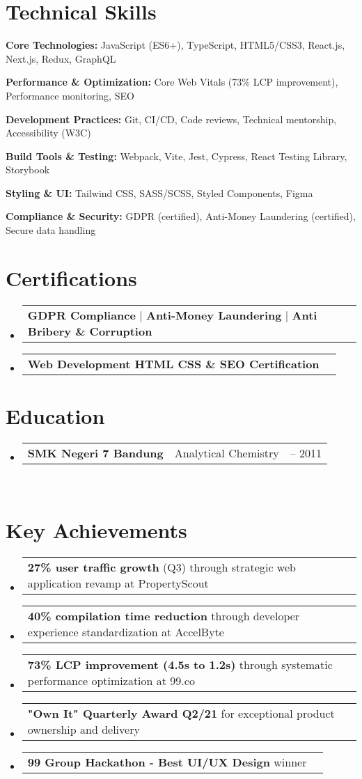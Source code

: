 \documentclass[a4paper, 11pt]{article}
\makeatletter
\newcommand{\resumeSubheading}[4]{
  \vspace{-2pt}\item
    \begin{tabularx}{0.987\textwidth}[t]{
  >{\raggedright\arraybackslash}X
  >{\centering\arraybackslash}X
  >{\raggedleft\arraybackslash}X }
      \textbf{#1} & #2 & #3 \\
    \end{tabularx}
    \textit{\small#4}\\
    \vspace{-7pt}
}
\newcommand{\resumeProjectHeading}[2]{
    \item
    \begin{tabular*}{0.987\textwidth}{l@{\extracolsep{\fill}}r}
      \small#1\\
    \end{tabular*}\vspace{-7pt}
}
\newcommand{\resumeSubHeadingListStart}{\begin{itemize}[leftmargin=0.1in, label={}]}
\newcommand{\resumeSubHeadingListEnd}{\end{itemize}\vspace{5pt}}
\makeatother
\begin{document}
\section{Technical Skills}
    \resumeSubHeadingListStart
        \small{
            \item \textbf{Core Technologies:} JavaScript (ES6+), TypeScript, HTML5/CSS3, React.js, Next.js, Redux, GraphQL
            \item \textbf{Performance \& Optimization:} Core Web Vitals (73\% LCP improvement), Performance monitoring, SEO
            \item \textbf{Development Practices:} Git, CI/CD, Code reviews, Technical mentorship, Accessibility (W3C)
            \item \textbf{Build Tools \& Testing:} Webpack, Vite, Jest, Cypress, React Testing Library, Storybook
            \item \textbf{Styling \& UI:} Tailwind CSS, SASS/SCSS, Styled Components, Figma
            \item \textbf{Compliance \& Security:} GDPR (certified), Anti-Money Laundering (certified), Secure data handling
        }
    \resumeSubHeadingListEnd

\section{Certifications}
    \resumeSubHeadingListStart
        \resumeProjectHeading
            {\textbf{GDPR Compliance} $|$ \textbf{Anti-Money Laundering} $|$ \textbf{Anti Bribery \& Corruption}}{}
        \resumeProjectHeading
            {\textbf{Web Development HTML CSS \& SEO Certification}}{}
    \resumeSubHeadingListEnd

\section{Education}
    \resumeSubHeadingListStart
        \resumeSubheading
            {SMK Negeri 7 Bandung}{Analytical Chemistry}{2009 -- 2011}{}
    \resumeSubHeadingListEnd

\section{Key Achievements}
    \resumeSubHeadingListStart
        \resumeProjectHeading
            {\textbf{27\% user traffic growth} (Q3) through strategic web application revamp at PropertyScout}{}
        \resumeProjectHeading
            {\textbf{40\% compilation time reduction} through developer experience standardization at AccelByte}{}
        \resumeProjectHeading
            {\textbf{73\% LCP improvement (4.5s to 1.2s)} through systematic performance optimization at 99.co}{}
        \resumeProjectHeading
            {\textbf{"Own It" Quarterly Award Q2/21} for exceptional product ownership and delivery}{}
        \resumeProjectHeading
            {\textbf{99 Group Hackathon - Best UI/UX Design} winner}{}
    \resumeSubHeadingListEnd
\end{document}
